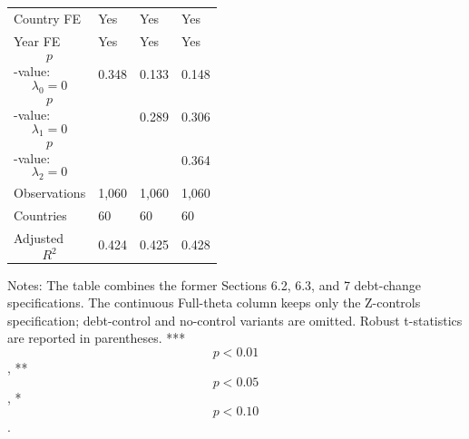 \begin{table}[H]
\begin{threeparttable}
\begin{tabularx}{\textwidth}{lYYY}
Country FE & Yes & Yes & Yes \\
Year FE & Yes & Yes & Yes \\
$$p$$-value: $$\lambda_0=0$$ & 0.348 & 0.133 & 0.148 \\
$$p$$-value: $$\lambda_1=0$$ &  & 0.289 & 0.306 \\
$$p$$-value: $$\lambda_2=0$$ &  &  & 0.364 \\
Observations & 1,060 & 1,060 & 1,060 \\
Countries & 60 & 60 & 60 \\
Adjusted $$R^2$$ & 0.424 & 0.425 & 0.428 \\
\bottomrule
\end{tabularx}
\begin{tablenotes}[flushleft]\footnotesize
\item Notes: The table combines the former Sections 6.2, 6.3, and 7 debt-change specifications. The continuous Full-theta column keeps only the Z-controls specification; debt-control and no-control variants are omitted. Robust t-statistics are reported in parentheses. *** $$p<0.01$$, ** $$p<0.05$$, * $$p<0.10$$.
\end{tablenotes}
\end{threeparttable}
\end{table}
